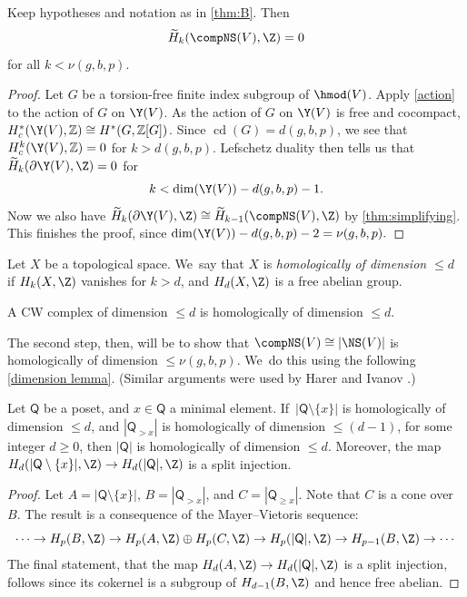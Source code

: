 \begin{prop}\label{high connectivity} Keep hypotheses and notation as in \cref{thm:B}. Then
\[
\widetilde H_k(\compNS(V),\Z)=0
\]
for all $k<\nu(g,b,p).$
\end{prop}

\begin{proof}Let $G$ be a torsion-free finite index subgroup of $\hmod(V)$. Apply \cref{action} to the action of $G$ on $\Y(V)$. As the action of $G$ on $\Y(V)$ is free and cocompact, $H^*_c(\Y(V),\mathbb{Z})\cong H^*(G,\mathbb{Z}[G])$. Since $\operatorname{cd}(G)=d(g,b,p)$, we see that $H^k_c(\Y(V),\mathbb{Z})=0$ for $k>d(g,b,p)$. Lefschetz duality then tells us that $\widetilde H_k(\partial \Y(V),\Z)=0$ for
\[
k<\dim(\Y(V))-d(g,b,p)-1.
\]
Now we also have $\widetilde H_k(\partial \Y(V),\Z) \cong \widetilde H_{k-1}(\compNS(V),\Z)$ by \cref{thm:simplifying}. This finishes the proof, since $\dim(\Y(V)) - d(g,b,p)-2=\nu(g,b,p).$
\end{proof}

\begin{defn}Let $X$ be a topological space. We~say that $X$ is \emph{homologically of dimension $\leq d$} if $H_k(X,\Z)$ vanishes for $k>d$, and $H_d(X,\Z)$ is a free abelian group.\end{defn}

\begin{rem}
A CW complex of dimension $\leq d$ is homologically of dimension $\leq d$.
\end{rem}

The second step, then, will be to show that $\compNS(V) \cong |\NS(V)|$ is homologically of dimension $\leq \nu(g,b,p)$. We~do this using the following \cref{dimension lemma}. (Similar arguments were used by Harer \cite{harer} and Ivanov \cite{ivanov}.)

\begin{lem}\label{MV lemma}Let $\mathsf Q$ be a poset, and $x \in \mathsf Q$ a minimal element. If~$|\mathsf Q \setminus \{x\}|$ is homologically of dimension $\leq d$, and $|\mathsf Q_{>x}|$ is homologically of dimension $\leq (d-1)$, for some integer $d \geq 0$, then $|\mathsf Q|$ is homologically of dimension $\leq d$. Moreover, the map $H_d(|\mathsf Q \setminus \{x\}|,\Z)\to H_d(|\mathsf Q|,\Z)$ is a split injection.
\end{lem}

\begin{proof}
Let $A = |\mathsf Q \setminus \{x\}|$, $B = |\mathsf Q_{>x}|$, and $C = |\mathsf Q_{\geq x}|$. Note that $C$ is a cone over~$B$. The result is a consequence of the Mayer--Vietoris sequence:
\[
\cdots
\to H_p(B,\Z) \to H_p(A,\Z) \oplus H_p(C,\Z) \to H_p(|\mathsf Q|,\Z) \to H_{p-1}(B,\Z) \to \cdots
\]The final statement, \ie that the map $H_d(A,\Z)\to H_d(|\mathsf Q|,\Z)$ is a split injection, follows since its cokernel is a subgroup of $H_{d-1}(B,\Z)$ and hence free abelian.\end{proof}

